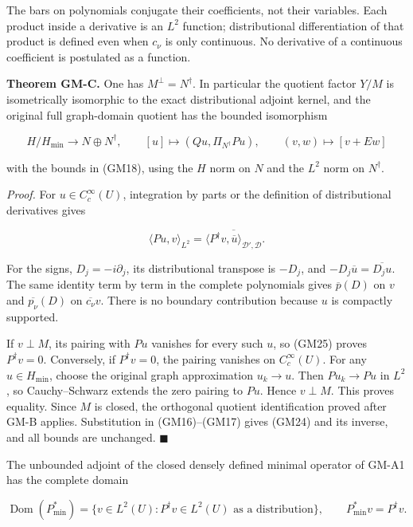 \documentclass[
  11pt,
]{article}
\begin{document}
The bars on polynomials conjugate their coefficients, not their
variables. Each product inside a derivative is an
\(L^2\) function; distributional differentiation of
that product is defined even when \(c_\nu\) is only
continuous. No derivative of a continuous coefficient is postulated as a
function.

\textbf{Theorem GM-C.} One has \(M^\perp=N^\dagger\). In particular
the quotient factor \(Y/M\) is isometrically
isomorphic to the exact distributional adjoint kernel, and the original
full graph-domain quotient has the bounded isomorphism

\[
 H/H_{\min}\longrightarrow N\oplus N^\dagger,
 \qquad [u]\longmapsto(Qu,\Pi_{N^\dagger}Pu),
 \qquad
 (v,w)\longmapsto[v+Ew]
 \tag{GM24}
\]

with the bounds in (GM18), using the \(H\) norm on
\(N\) and the \(L^2\) norm on
\(N^\dagger\).

\emph{Proof.} For \(u\in C_c^\infty(U)\), integration by parts or
the definition of distributional derivatives gives

\[
 \langle Pu,v\rangle_{L^2}
   =\overline{\langle P^\dagger v,\overline u\rangle_{\mathcal D',\mathcal D}}.
 \tag{GM25}
\]

For the signs, \(D_j=-i\partial_j\), its distributional transpose
is \(-D_j\), and \(-D_j\overline u=\overline{D_ju}\). The same
identity term by term in the complete polynomials gives
\(\overline p(D)\) on \(v\) and
\(\overline{p_\nu}(D)\) on \(\overline{c_\nu}v\). There is no
boundary contribution because \(u\) is compactly
supported.

If \(v\perp M\), its pairing with
\(Pu\) vanishes for every such
\(u\), so (GM25) proves \(P^\dagger v=0\).
Conversely, if \(P^\dagger v=0\), the pairing vanishes on
\(C_c^\infty(U)\). For any \(u\in H_{\min}\), choose
the original graph approximation \(u_k\to u\). Then
\(Pu_k\to Pu\) in \(L^2\), so
Cauchy--Schwarz extends the zero pairing to \(Pu\).
Hence \(v\perp M\). This proves equality. Since
\(M\) is closed, the orthogonal quotient
identification proved after GM-B applies. Substitution in (GM16)--(GM17)
gives (GM24) and its inverse, and all bounds are unchanged.
\hfill\ensuremath{\blacksquare}

The unbounded adjoint of the closed densely defined minimal operator of
GM-A1 has the complete domain

\[
 \operatorname{Dom}(P_{\min}^*)
   =\{v\in L^2(U):P^\dagger v\in L^2(U)\text{ as a distribution}\},
 \qquad P_{\min}^*v=P^\dagger v.
 \tag{GM26}
\]
\end{document}
